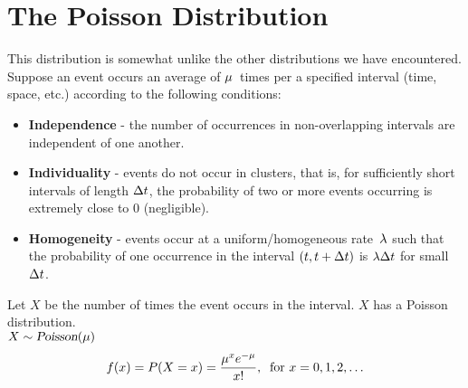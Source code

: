 \section{The Poisson Distribution}
This distribution is somewhat unlike the other distributions we have encountered. Suppose an event occurs an average of $\mu$~times per a specified interval (time, space, etc.) according to the following conditions:
\begin{itemize}
    \item \textbf{Independence} - the number of occurrences in non-overlapping intervals are independent of one another.
    \item \textbf{Individuality} - events do not occur in clusters, that is, for sufficiently short intervals of length $\Delta t$, the probability of two or more events occurring is extremely close to 0 (negligible).
    \item \textbf{Homogeneity} - events occur at a uniform/homogeneous rate~$\lambda$ such that the probability of one occurrence in the interval $(t, t+\Delta t)$ is $\lambda \Delta t$ for small $\Delta t$.
\end{itemize}
Let $X$ be the number of times the event occurs in the interval. $X$ has a Poisson distribution. \\
$X \sim \operatorname{\textsl{Poisson}}(\mu)$
\[
    f(x) = P(X = x) = \frac{\mu^x e^{-\mu}}{x!},\:\text{ for } x = 0,1,2,\ldots
\]
\pagebreak[3]
